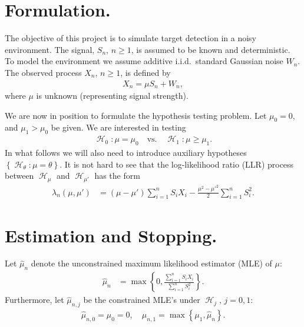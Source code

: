 \documentclass{article}
\renewcommand{\geq}{\geqslant}
\newcommand{\nolabel}[1]{}
\newcommand{\set}[1]{\left\{ #1 \right\}}
\DeclareMathOperator{\Hyp}{\mathcal{H}}
\DeclareMathOperator{\DNormal}{\mathcal{N}} %
\newcommand{\hmu}{\hat{\mu}}
\begin{document}
\section*{Formulation.}

The objective of this project is to simulate target detection in a noisy environment.
The signal, $S_n$, $n \geq 1$, is assumed to be known and deterministic.
To model the environment we assume additive i.i.d.\ standard Gaussian noise $W_n$.
The observed process $X_n$, $n \geq 1$, is defined by
\begin{align*} \nolabel{eq:observed_process}
    X_n = \mu S_n + W_n,
\end{align*}
where $\mu$ is unknown (representing signal strength).

We are now in position to formulate the hypothesis testing problem.
%
Let $\mu_0 = 0$, and $\mu_1 > \mu_0$ be given. We are interested in testing
\begin{align} \label{eq:model}
    \Hyp_0 : \mu = \mu_0
    \quad \text{vs.} \quad
    \Hyp_1 : \mu \geq \mu_1.
\end{align}
In what follows we will also need to introduce auxiliary hypotheses $\set{\Hyp_\theta : \mu = \theta }$.
%
It is not hard to see that the log-likelihood ratio (LLR) process between $\Hyp_\mu$ and $\Hyp_{\mu'}$ has the form
\begin{align} \label{eq:LLR:general}
    \lambda_n(\mu, \mu')
        &= (\mu - \mu') \sum_{i = 1}^{n} S_i X_i
        - \frac{\mu^2 - {\mu'}^2}{2} \sum_{i = 1}^{n} S_i^2.
\end{align}

\section*{Estimation and Stopping.}

Let $\hmu_n$ denote the unconstrained maximum likelihood estimator (MLE) of $\mu$:
\begin{align*} \nolabel{eq:mle:unconstrained}
    \hmu_n &= \max\set{0, \frac{\sum_{i = 1}^n S_i X_i}{\sum_{i = 1}^n S_i^2}}.
\end{align*}
Furthermore, let $\hmu_{n, j}$ be the constrained MLE's under $\Hyp_j$, $j = 0, 1$:
\begin{align*} \nolabel{eq:mle:constrained}
    \hmu_{n, 0} = \mu_0 = 0, \quad
    \hmu_{n, 1} = \max \set{\mu_1, \hmu_n}.
\end{align*}
\end{document}
